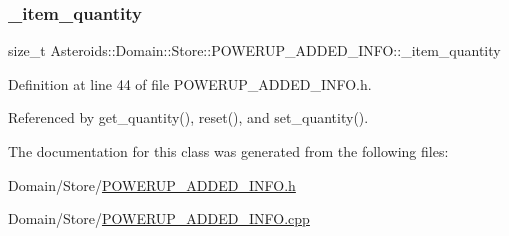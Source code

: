\subsubsection{\texorpdfstring{\+\_\+item\+\_\+quantity}{\_item\_quantity}}
{\footnotesize\ttfamily size\+\_\+t Asteroids\+::\+Domain\+::\+Store\+::\+P\+O\+W\+E\+R\+U\+P\+\_\+\+A\+D\+D\+E\+D\+\_\+\+I\+N\+F\+O\+::\+\_\+item\+\_\+quantity\hspace{0.3cm}{\ttfamily [private]}}



Definition at line 44 of file P\+O\+W\+E\+R\+U\+P\+\_\+\+A\+D\+D\+E\+D\+\_\+\+I\+N\+F\+O.\+h.



Referenced by get\+\_\+quantity(), reset(), and set\+\_\+quantity().



The documentation for this class was generated from the following files\+:\begin{DoxyCompactItemize}
\item 
Domain/\+Store/\hyperlink{POWERUP__ADDED__INFO_8h}{P\+O\+W\+E\+R\+U\+P\+\_\+\+A\+D\+D\+E\+D\+\_\+\+I\+N\+F\+O.\+h}\item 
Domain/\+Store/\hyperlink{POWERUP__ADDED__INFO_8cpp}{P\+O\+W\+E\+R\+U\+P\+\_\+\+A\+D\+D\+E\+D\+\_\+\+I\+N\+F\+O.\+cpp}\end{DoxyCompactItemize}
